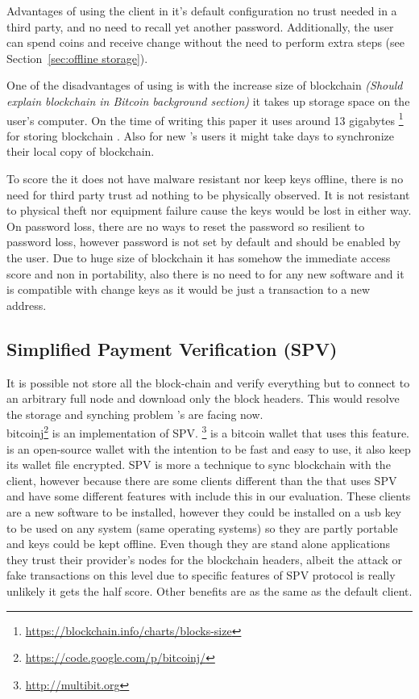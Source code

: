 Advantages of using the \bitcoinclient client in it's default configuration no trust needed in a third party, and no need to recall yet another password. Additionally, the user can spend coins and receive change without the need to perform extra steps (see Section~\ref{sec:offline storage}). 

One of the disadvantages of using \bitcoinclient is with the increase size of blockchain \textit {(Should explain blockchain in Bitcoin background section)}  it takes up storage space on the user's computer. On the time of writing this paper it uses around 13 gigabytes \footnote{\url{https://blockchain.info/charts/blocks-size}} for storing blockchain . Also for new \bitcoinclient's users it might take days to synchronize their local copy of blockchain.

To score the \bitcoinclient it does not have malware resistant nor keep keys offline, there is no need for third party trust ad nothing to be physically observed. It is not resistant to physical theft nor equipment failure cause the keys would be lost in either way. On password loss, there are no ways to reset the password so resilient to password loss, however password is not set by default and should be enabled by the user. Due to huge size of blockchain it has somehow the immediate access score and non in portability, also there is no need to for any new software and it is compatible with change keys as it would be just a transaction to a new address.
\subsection{Simplified Payment Verification (SPV)}
It is possible not store all the block-chain and verify everything but to connect to an arbitrary full node and download only the block headers. This would resolve the storage and synching problem \bitcoinclient's are facing now. \\
bitcoinj\footnote{\url {https://code.google.com/p/bitcoinj/}} is an implementation of SPV.
 \multibit \footnote{\url {http://multibit.org}} is a bitcoin wallet that uses this feature. \multibit is an open-source wallet with the intention to be fast and easy to use, it also keep its wallet file encrypted.
SPV is more a technique to sync blockchain with the client, however because there are some clients different than the \bitcoinclient that uses SPV and have some different features with include this in our evaluation.
These clients are a new software to be installed, however they could be installed on a usb key to be used on any system (same operating systems) so they are partly portable and keys could be kept offline. Even though they are stand alone applications they trust their provider's nodes for the blockchain headers, albeit the attack or fake transactions on this level due to specific features of SPV protocol is really unlikely it gets the half score. Other benefits are as the same as the default client.


